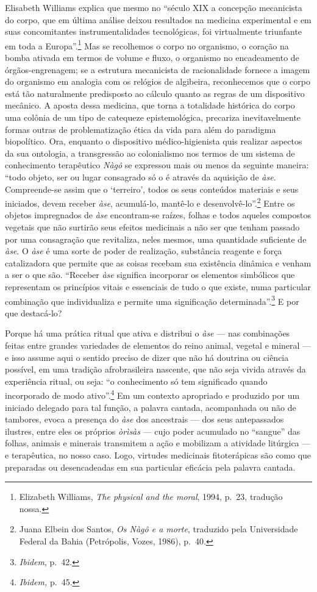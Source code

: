 Elisabeth Williams explica que mesmo no ``século XIX a concepção
mecanicista do corpo, que em última análise deixou resultados na
medicina experimental e em suas concomitantes instrumentalidades
tecnológicas, foi virtualmente triunfante em toda a Europa''.\footnote{Elizabeth
  Williams, \textit{The physical and the moral}, 1994, p.~23, tradução
  nossa.} Mas se recolhemos o corpo no organismo, o coração na bomba
ativada em termos de volume e fluxo, o organismo no encadeamento de
órgãos-engrenagem; se a estrutura mecanicista de racionalidade fornece a
imagem do organismo em analogia com os relógios de algibeira,
reconhecemos que o corpo está tão naturalmente predisposto ao cálculo
quanto as regras de um dispositivo mecânico. A aposta dessa medicina,
que torna a totalidade histórica do corpo uma colônia de um tipo de
catequeze epistemológica, precariza inevitavelmente formas outras de
problematização ética da vida para além do paradigma biopolítico. Ora,
enquanto o dispositivo médico-higienista quis realizar aspectos da sua
ontologia, a transgressão ao colonialismo nos termos de um sistema de
conhecimento terapêutico \textit{Nàgô} se expressou mais ou menos da
seguinte maneira: ``todo objeto, ser ou lugar consagrado só o é através
da aquisição de \textit{àse}. Compreende-se assim que o `terreiro', todos
os seus conteúdos materiais e seus iniciados, devem receber \textit{àse},
acumulá-lo, mantê-lo e desenvolvê-lo''.\footnote{Juana Elbein dos
  Santos, \textit{Os Nàgô e a morte}, traduzido pela Universidade Federal
  da Bahia (Petrópolis, Vozes, 1986), p.~40.} Entre os objetos
impregnados de \textit{àse} encontram-se raízes, folhas e todos aqueles
compostos vegetais que não surtirão seus efeitos medicinais a não ser
que tenham passado por uma consagração que revitaliza, neles mesmos, uma
quantidade suficiente de \textit{àse}. O \textit{àse} é uma sorte de poder
de realização, substância reagente e força catalizadora que permite que
as coisas recebam sua existência dinâmica e venham a ser o que são.
``Receber \textit{àse} significa incorporar os elementos simbólicos que
representam os princípios vitais e essenciais de tudo o que existe, numa
particular combinação que individualiza e permite uma significação
determinada''.\footnote{\textit{Ibidem}, p.~42.} E por que destacá-lo?

Porque há uma prática ritual que ativa e distribui o \textit{àse} --- nas
combinações feitas entre grandes variedades de elementos do reino
animal, vegetal e mineral --- e isso assume aqui o sentido preciso de
dizer que não há doutrina ou ciência possível, em uma tradição
afrobrasileira nascente, que não seja vivida através da experiência
ritual, ou seja: ``o conhecimento só tem significado quando incorporado
de modo ativo''.\footnote{\textit{Ibidem,} p.~45.} Em um contexto
apropriado e produzido por um iniciado delegado para tal função, a
palavra cantada, acompanhada ou não de tambores, evoca a presença do
\textit{àse} dos ancestrais --- dos seus antepassados ilustres, entre eles
os próprios \textit{òrìsàs} --- cujo poder acumulado no ``sangue'' das
folhas, animais e minerais transmitem a ação e mobilizam a atividade
litúrgica --- e terapêutica, no nosso caso. Logo, virtudes medicinais
fitoterápicas são como que preparadas ou desencadeadas em sua particular
eficácia pela palavra cantada.

